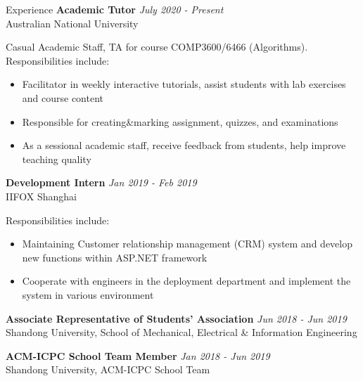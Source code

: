 \documentclass{resume} %
\begin{document}
\begin{rSection}{Experience}
{\bf Academic Tutor} \hfill {\em July 2020 - Present}\\
{Australian National University}

Casual Academic Staff, TA for course COMP3600/6466 (Algorithms). Responsibilities include:
\begin{itemize}
	\item Facilitator in weekly interactive tutorials, assist students with lab exercises and course content
	\item Responsible for creating\&marking assignment, quizzes, and examinations
	\item As a sessional academic staff, receive feedback from students, help improve teaching quality
\end{itemize}


{\bf Development Intern} \hfill {\em Jan 2019 - Feb 2019}\\
{IIFOX Shanghai}

Responsibilities include:
\begin{itemize}
	\item Maintaining Customer relationship management (CRM) system and develop new functions within ASP.NET framework
	\item Cooperate with engineers in the deployment department and implement the system in various environment
\end{itemize}
 
{\bf Associate Representative of Students' Association} \hfill {\em Jun 2018 - Jun 2019}\\
{Shandong University, School of Mechanical, Electrical \& Information Engineering}

{\bf ACM-ICPC School Team Member} \hfill {\em Jan 2018 - Jun 2019}\\
{Shandong University, ACM-ICPC School Team}

\end{rSection}
\end{document}
